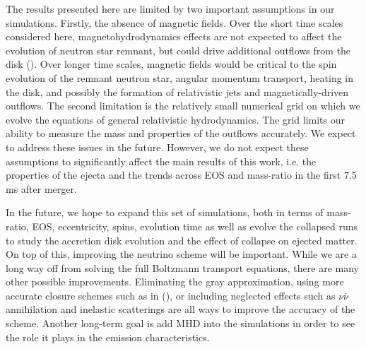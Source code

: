 The results presented here are limited by two important assumptions in our simulations. Firstly, the absence of magnetic fields. Over the short time scales considered here, magnetohydrodynamics effects are not expected to affect the evolution of neutron star remnant, but could drive additional outflows from the disk (\cite{kiuchi2014,neilsen2014magnetized}). Over longer time scales, magnetic fields would be critical to the spin evolution of the remnant neutron star, angular momentum transport, heating in the disk, and possibly the formation of relativistic jets and magnetically-driven outflows. The second limitation is the relatively small numerical grid on which we evolve the equations of general relativistic hydrodynamics. The grid limits our ability to measure the mass and properties of the outflows accurately. We expect to address these issues in the future. However, we do not expect these assumptions to significantly affect the main results of this work, i.e. the properties of the ejecta and the trends across EOS and mass-ratio in the first 7.5 ms after merger.

In the future, we hope to expand this set of simulations, both in terms of mass-ratio, EOS, eccentricity, spins, evolution time as well as evolve the collapsed runs to study the accretion disk evolution and the effect of collapse on ejected matter. On top of this, improving the neutrino scheme will be important. While we are a long way off from solving the full Boltzmann transport equations, there are many other possible improvements. Eliminating the gray approximation, using more accurate closure schemes such as in (\cite{foucart:2017mbt}), or including neglected effects such as $\nu\overline\nu$ annihilation and inelastic scatterings are all ways to improve the accuracy of the scheme. Another long-term goal is add MHD into the simulations in order to see the role it plays in the emission characteristics.
